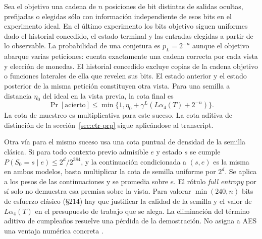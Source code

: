 Sea el objetivo una cadena de \(n\) posiciones de bit distintas
de salidas ocultas, prefijadas o elegidas sólo con información independiente
de esos bits en el experimento ideal. En el último experimento los bits
objetivo siguen uniformes dado el historial concedido, el estado terminal y
las entradas elegidas a partir de lo observable. La probabilidad de una
conjetura es \(p_L=2^{-n}\) aunque el objetivo abarque varias peticiones:
 cuenta exactamente una cadena correcta por
cada vista y elección de monedas.
El historial concedido excluye copias de la cadena objetivo o funciones
laterales de ella que revelen sus bits. El estado anterior y el estado
posterior de la misma petición constituyen otra vista. Para una semilla a
distancia \(\eta_0\) del ideal en la vista previa, la cota final es
\[
 \Pr[\text{acierto}]
 \le \min\{1,\eta_0+\gamma^L(L\alpha_4(T)+2^{-n})\}.
\]
La cota de muestreo es multiplicativa para este suceso. La cota aditiva de
distinción de la sección~\ref{sec:ctr-prp} sigue aplicándose al transcript.

Otra vía para el mismo suceso usa una cota puntual de densidad de la
semilla clásica. Si para todo contexto previo admisible \(e\) y estado \(s\)
se cumple \(P(S_0=s\mid e)\le 2^d/2^{384}\), y la continuación condicionada
a \((s,e)\) es la misma en ambos modelos, basta multiplicar la cota de
semilla uniforme por \(2^d\). Se aplica 
a los pesos de las continuaciones y se promedia sobre \(e\). El rótulo
\emph{full entropy} por sí solo no demuestra esa premisa sobre la vista.
Para valorar \(\min(240,n)\) bits de esfuerzo clásico (§214) hay que
justificar la calidad de la semilla y el valor de \(L\alpha_4(T)\) en el
presupuesto de trabajo que se alega. La eliminación del término aditivo de
cumpleaños resuelve una pérdida de la demostración. No asigna a AES una
ventaja numérica concreta \cite[§§121--122, 209 y 211--214]{ais}.

